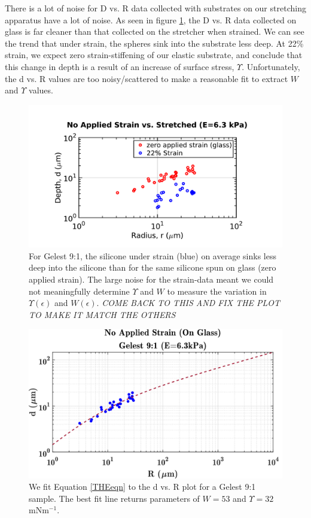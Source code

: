 There is a lot of noise for D vs. R data collected with substrates on our stretching apparatus have a lot of noise. As seen in figure \ref{fig:glassvsstretched190218}, the D vs. R data collected on glass is far cleaner than that collected on the stretcher when strained. We can see the trend that under strain, the spheres sink into the substrate less deep. At 22\% strain, we expect zero strain-stiffening of our elastic substrate, and conclude that this change in depth is a result of an increase of surface stress, $ \Upsilon $. Unfortunately, the d vs. R values are too noisy/scattered to make a reasonable fit to extract $ W $ and $ \Upsilon $ values.

\begin{figure}[h!]
	\centering
	\includegraphics[width=\linewidth]{Chapters/Figures/glass_vs_stretched_190218}
	\caption[Glass vs. Stretched d vs. R]{For Gelest 9:1, the silicone under strain (blue) on average sinks less deep into the silicone than for the same silicone spun on glass (zero applied strain). The large noise for the strain-data meant we could not meaningfully determine $ \Upsilon $ and $ W $ to measure the variation in $ \Upsilon(\epsilon)$ and $W(\epsilon)$. \emph{COME BACK TO THIS AND FIX THE PLOT TO MAKE IT MATCH THE OTHERS}}
	\label{fig:glassvsstretched190218}
\end{figure}

\begin{figure}[h!]
	\centering
	\includegraphics[width=\linewidth]{Chapters/Figures/w_ups_fit_G9-1}
	\caption[Gelest W-$\Upsilon$ Fit]{We fit Equation \ref{THEeqn} to the d vs. R plot for a Gelest 9:1 sample. The best fit line returns parameters of $ W=53 $  and $ \Upsilon=32 $ mNm$^{-1}$.}
	\label{fig:wupsfitg9-1}
\end{figure}

